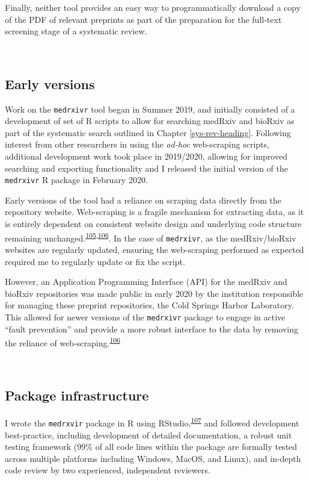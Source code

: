 \documentclass[a4paper, twoside]{templates/ociamthesis}
\begin{document}
Finally, neither tool provides an easy way to programmatically download a copy of the PDF of relevant preprints as part of the preparation for the full-text screening stage of a systematic review.

~

\hypertarget{early-versions}{%
\subsection{Early versions}\label{early-versions}}

Work on the \texttt{medrxivr} tool began in Summer 2019, and initially consisted of a development of set of R scripts to allow for searching medRxiv and bioRxiv as part of the systematic search outlined in Chapter \ref{sys-rev-heading}. Following interest from other researchers in using the \emph{ad-hoc} web-scraping scripts, additional development work took place in 2019/2020, allowing for improved searching and exporting functionality and I released the initial version of the \texttt{medrxivr} R package in February 2020.

Early versions of the tool had a reliance on scraping data directly from the repository website. Web-scraping is a fragile mechanism for extracting data, as it is entirely dependent on consistent website design and underlying code structure remaining unchanged.\textsuperscript{\protect\hyperlink{ref-shaw2002}{105},\protect\hyperlink{ref-laprie1992}{106}}. In the case of \texttt{medrxivr}, as the medRxiv/bioRxiv websites are regularly updated, ensuring the web-scraping performed as expected required me to regularly update or fix the script.

However, an Application Programming Interface (API) for the medRxiv and bioRxiv repositories was made public in early 2020 by the institution responsible for managing these preprint repositories, the Cold Springs Harbor Laboratory. This allowed for newer versions of the \texttt{medrxivr} package to engage in active ``fault prevention'' and provide a more robust interface to the data by removing the reliance of web-scraping.\textsuperscript{\protect\hyperlink{ref-laprie1992}{106}}

~

\hypertarget{package-infrastructure}{%
\subsection{Package infrastructure}\label{package-infrastructure}}

I wrote the \texttt{medrxvir} package in R using RStudio,\textsuperscript{\protect\hyperlink{ref-rcoreteam2019}{107}} and followed development best-practice, including development of detailed documentation, a robust unit testing framework (99\% of all code lines within the package are formally tested across multiple platforms including Windows, MacOS, and Linux), and in-depth code review by two experienced, independent reviewers.
\end{document}
